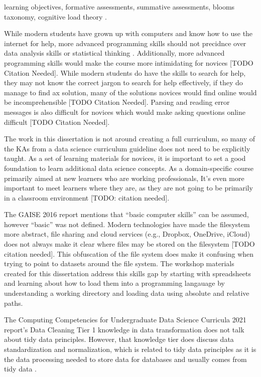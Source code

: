 \documentclass[../main.tex]{subfiles}
\begin{document}
        learning objectives, formative assessments, summative assessments, blooms taxonomy,
        cognitive load theory
        \cite{DonaldClarkPlan2020, dunloskyImprovingStudentsLearning2013}.

        

        While modern students have grown up with computers and know how to use the internet for help,
        more advanced programming skills should not precidnce over data analysis skills or statistical thinking
        \cite{gaise2016}.
        Additionally, more advanced programming skills would make the course more intimidating for novices [TODO Citation Needed].
        While modern students do have the skills to search for help,
        they may not know the correct jargon to search for help effectively,
        if they do manage to find ax solution,
        many of the solutions novices would find online would be incomprehensible [TODO Citation Needed].
        Parsing and reading error messages is also difficult for novices which would make asking questions online difficult [TODO Citation Needed].

        The work in this dissertation is not around creating a full curriculum,
        so many of the KAs from a data science curriculum guideline does not need to be explicitly taught.
        As a set of learning materials for novices,
        it is important to set a good foundation to learn additional data science concepts.
        As a domain-specific course primarily aimed at new learners who are working professionals,
        It's even more important to meet learners where they are, as they are not going to be primarily in a classroom environment
        [TODO: citation needed].

        The GAISE 2016 report mentions that ``basic computer skills'' can be assumed,
        however ``basic'' was not defined.
        Modern technologies have made the filesystem more abstract,
        file sharing and cloud services (e.g., Dropbox, OneDrive, iCloud) does not always make it clear where files may be stored on the filesystem [TODO citation needed].
        This obfuscation of the file system does make it confusing when trying to point to datasets around the file system.
        The workshop materials created for this dissertation address this skills gap by starting with spreadsheets and learning about how to load them into a programming langauage
        by understanding a working directory and loading data using absolute and relative paths.

        The Computing Competencies for Undergraduate Data Science Curricula 2021 report's
        Data Cleaning Tier 1 knowledge in data transformation does not talk about tidy data principles.
        However, that knowledge tier does discuss data standardization and normalization,
        which is related to tidy data principles as it is the data processing needed to store data for databases and
        usually comes from tidy data
        \cite{wickhamTidyData2014}.
        
\end{document}
